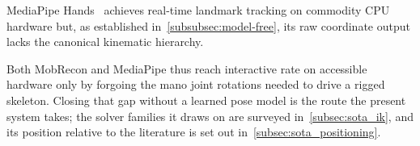 MediaPipe Hands~\cite{zhang2020mediapipehands} achieves real-time landmark
tracking on commodity CPU hardware but, as established
in~\autoref{subsubsec:model-free}, its raw coordinate output lacks
the canonical kinematic hierarchy.

Both MobRecon and MediaPipe thus reach interactive rate on accessible hardware
only by forgoing the \acrshort{mano} joint rotations needed to drive a rigged
skeleton.
Closing that gap without a learned pose model is the route the present system
takes; the solver families it draws on are surveyed in~\autoref{subsec:sota_ik},
and its position relative to the literature is set out
in~\autoref{subsec:sota_positioning}.

